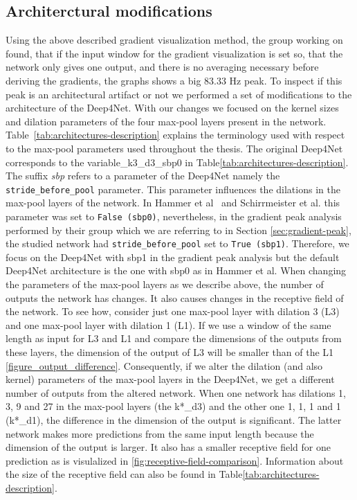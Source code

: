 \subsection{Architerctural modifications}
Using the above described gradient visualization method, the group working on~\cite{Hammer-2021} found, that if the input window for the gradient visualization is set so, that the network only gives one output, and there is no averaging necessary before deriving the gradients, the graphs shows a big 83.33 Hz peak.
To inspect if this peak is an architectural artifact or not we performed a set of modifications to the architecture of the Deep4Net.
With our changes we focused on the kernel sizes and dilation parameters of the four max-pool layers present in the network.
Table~\ref{tab:architectures-description} explains the terminology used with respect to the max-pool parameters used throughout the thesis.
The original Deep4Net corresponds to the {variable}\_k3\_d3\_sbp0 in Table\ref{tab:architectures-description}.
The suffix \textit{sbp} refers to a parameter of the Deep4Net namely the \texttt{stride\_before\_pool} parameter.
This parameter influences the dilations in the max-pool layers of the network. In Hammer et al~\cite{Hammer-2021} and Schirrmeister et al. \cite{schirrmeister-deep-2017}this parameter was set to \texttt{False (sbp0)}, nevertheless, in the gradient peak analysis performed by their group which we are referring to in Section \cref{sec:gradient-peak}, the studied network had \texttt{stride\_before\_pool} set to \texttt{True (sbp1)}.
Therefore, we focus on the Deep4Net with sbp1 in the gradient peak analysis but the default Deep4Net architecture is the one with sbp0 as in Hammer et al.
When changing the parameters of the max-pool layers as we describe above, the number of outputs the network has changes.
It also causes changes in the receptive field of the network.
To see how, consider just one max-pool layer with dilation 3 (L3) and one max-pool layer with dilation 1 (L1). If we use a window of the same length as input for L3 and L1 and compare the dimensions of the outputs from these layers, the dimension of the output of L3 will be smaller than of the L1 \ref{figure_output_difference}.
Consequently, if we alter the dilation (and also kernel) parameters of the max-pool layers in the Deep4Net, we get a different number of outputs from the altered network.
When one network has dilations 1, 3, 9 and 27 in the max-pool layers (the k*\_d3) and the other one 1, 1, 1 and 1 (k*\_d1), the difference in the dimension of the output is significant.
The latter network makes more predictions from the same input length because the dimension of the output is larger.
It also has a smaller receptive field for one prediction as is visulalized in \cref{fig:receptive-field-comparison}.
Information about the size of the receptive field can also be found in Table\ref{tab:architectures-description}.

